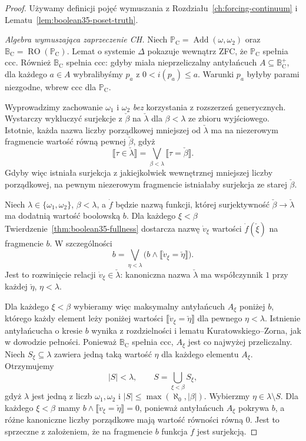 \begin{proof}
Używamy definicji pojęć
wymuszania z
Rozdziału~\ref{ch:forcing-continuum}
i Lematu~\ref{lem:boolean35-poset-truth}.

\emph{Algebra wymuszająca zaprzeczenie CH.}
Niech
$\mathbb P_{\mathrm C}
=\operatorname{Add}(\omega,\omega_2)$
oraz
$\mathbb B_{\mathrm C}
=\operatorname{RO}(\mathbb P_{\mathrm C})$.
Lemat o systemie $\Delta$
pokazuje wewnątrz ZFC,
że $\mathbb P_{\mathrm C}$
spełnia ccc. Również
$\mathbb B_{\mathrm C}$
spełnia ccc: gdyby miała
nieprzeliczalny antyłańcuch
$A\subseteq\mathbb B_{\mathrm C}^+$,
dla każdego $a\in A$
wybralibyśmy $p_a$ z
$0<i(p_a)\le a$. Warunki
$p_a$ byłyby parami niezgodne,
wbrew ccc dla
$\mathbb P_{\mathrm C}$.

Wyprowadzimy zachowanie
$\omega_1$ i $\omega_2$
\emph{bez} korzystania
z rozszerzeń generycznych.
Wystarczy wykluczyć surjekcje
z $\check\beta$ na
$\check\lambda$ dla
$\beta<\lambda$ ze zbioru
wyjściowego. Istotnie, każda
nazwa liczby porządkowej
mniejszej od $\check\lambda$
ma na niezerowym fragmencie
wartość równą pewnej
$\check\beta$, gdyż
\[
 \llbracket\tau\in
           \check\lambda\rrbracket
 =\bigvee_{\beta<\lambda}
   \llbracket\tau=\check\beta\rrbracket.
\]
Gdyby więc istniała
surjekcja z jakiejkolwiek
wewnętrznej mniejszej liczby
porządkowej, na pewnym
niezerowym fragmencie
istniałaby surjekcja
ze starej $\check\beta$.

Niech
$\lambda\in\{\omega_1,\omega_2\}$,
$\beta<\lambda$, a $\dot f$
będzie nazwą funkcji, której
surjektywność
$\check\beta\to\check\lambda$
ma dodatnią wartość boolowską
$b$. Dla każdego $\xi<\beta$
Twierdzenie~\ref{thm:boolean35-fullness}
dostarcza
nazwę $\dot v_\xi$ wartości
$\dot f(\check\xi)$ na
fragmencie $b$.
W szczególności
\[
 b=\bigvee_{\eta<\lambda}
       \bigl(b\wedge
       \llbracket\dot v_\xi
               =\check\eta\rrbracket\bigr).
\]
Jest to rozwinięcie relacji
$\dot v_\xi\in\check\lambda$:
kanoniczna nazwa
$\check\lambda$ ma współczynnik
$1$ przy każdej $\check\eta$,
$\eta<\lambda$.

Dla każdego $\xi<\beta$
wybieramy więc maksymalny
antyłańcuch $A_\xi$ poniżej
$b$, którego każdy element
leży poniżej wartości
$\llbracket\dot v_\xi
=\check\eta\rrbracket$
dla pewnego $\eta<\lambda$.
Istnienie antyłańcucha
o kresie $b$ wynika
z rozdzielności i
lematu Kuratowskiego--Zorna,
jak w dowodzie pełności.
Ponieważ $\mathbb B_{\mathrm C}$
spełnia ccc, $A_\xi$
jest co najwyżej przeliczalny.
Niech $S_\xi\subseteq\lambda$
zawiera jedną taką wartość
$\eta$ dla każdego elementu
$A_\xi$. Otrzymujemy
\[
 |S|<\lambda,\qquad
 S=\bigcup_{\xi<\beta}S_\xi,
\]
gdyż $\lambda$ jest jedną
z liczb $\omega_1,\omega_2$
i
$|S|\le\max(\aleph_0,|\beta|)$.
Wybierzmy $\eta\in\lambda
\setminus S$. Dla każdego
$\xi<\beta$ mamy
$b\wedge\llbracket
\dot v_\xi=\check\eta\rrbracket=0$,
ponieważ antyłańcuch
$A_\xi$ pokrywa $b$,
a różne kanoniczne liczby
porządkowe mają wartość
równości równą $0$.
Jest to sprzeczne
z założeniem, że na
fragmencie $b$ funkcja
$\dot f$ jest surjekcją.


\end{proof}
